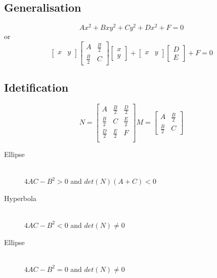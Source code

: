 \documentclass[11pt,twoside,a4paper]{article}
\begin{document}
    \subsection{Generalisation}
      \[ Ax^2 + Bxy^2 + Cy^2 + Dx^2 + F = 0 \]
      or
      \[
        \begin{bmatrix} x & y \end{bmatrix}
        \begin{bmatrix}
          A           & \frac{B}{2} \\[0.3em]
          \frac{B}{2} & C
        \end{bmatrix}
        \begin{bmatrix} x \\ y \end{bmatrix}
        +
        \begin{bmatrix} x & y \end{bmatrix}
        \begin{bmatrix} D \\ E \end{bmatrix}
        + F = 0
      \]
    
    \subsection{Idetification}
      \[
        N =
          \begin{bmatrix}
            A           & \frac{B}{2} & \frac{D}{2} \\[0.3em]
            \frac{B}{2} & C           & \frac{E}{2} \\[0.3em]
            \frac{D}{2} & \frac{E}{2} & F           \\
          \end{bmatrix}
        M =
          \begin{bmatrix}
            A           & \frac{B}{2} \\[0.3em]
            \frac{B}{2} & C
          \end{bmatrix}
      \]
      \begin{description}
        \item[Ellipse] \hfill \\
          \( 4AC - B^2 > 0 \) and \( det(N)(A+C) < 0 \)
        
        \item[Hyperbola] \hfill \\
          \( 4AC - B^2 < 0 \) and \( det(N) \neq 0 \)
        
        \item[Ellipse] \hfill \\
          \( 4AC - B^2 = 0 \) and \( det(N) \neq 0 \)
      \end{description}
  
\end{document}
